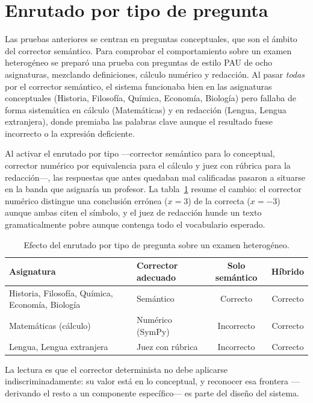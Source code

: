 \section{Enrutado por tipo de pregunta}

Las pruebas anteriores se centran en preguntas conceptuales, que son el ámbito del corrector semántico. Para comprobar el comportamiento sobre un examen heterogéneo se preparó una prueba con preguntas de estilo PAU de ocho asignaturas, mezclando definiciones, cálculo numérico y redacción. Al pasar \emph{todas} por el corrector semántico, el sistema funcionaba bien en las asignaturas conceptuales (Historia, Filosofía, Química, Economía, Biología) pero fallaba de forma sistemática en cálculo (Matemáticas) y en redacción (Lengua, Lengua extranjera), donde premiaba las palabras clave aunque el resultado fuese incorrecto o la expresión deficiente.

Al activar el enrutado por tipo —corrector semántico para lo conceptual, corrector numérico por equivalencia para el cálculo y juez con rúbrica para la redacción—, las respuestas que antes quedaban mal calificadas pasaron a situarse en la banda que asignaría un profesor. La tabla~\ref{tab:router} resume el cambio: el corrector numérico distingue una conclusión errónea ($x=3$) de la correcta ($x=-3$) aunque ambas citen el símbolo, y el juez de redacción hunde un texto gramaticalmente pobre aunque contenga todo el vocabulario esperado.

\begin{table}[ht]
\centering
\caption{Efecto del enrutado por tipo de pregunta sobre un examen heterogéneo.}
\label{tab:router}
\small
\begin{tabularx}{\textwidth}{>{\raggedright\arraybackslash}p{} >{\raggedright\arraybackslash}X c c}
\toprule
Asignatura & Corrector adecuado & Solo semántico & Híbrido \\
\midrule
Historia, Filosofía, Química, Economía, Biología & Semántico & Correcto & Correcto \\
Matemáticas (cálculo) & Numérico (SymPy) & Incorrecto & Correcto \\
Lengua, Lengua extranjera & Juez con rúbrica & Incorrecto & Correcto \\
\bottomrule
\end{tabularx}
\end{table}

La lectura es que el corrector determinista no debe aplicarse indiscriminadamente: su valor está en lo conceptual, y reconocer esa frontera —derivando el resto a un componente específico— es parte del diseño del sistema.

